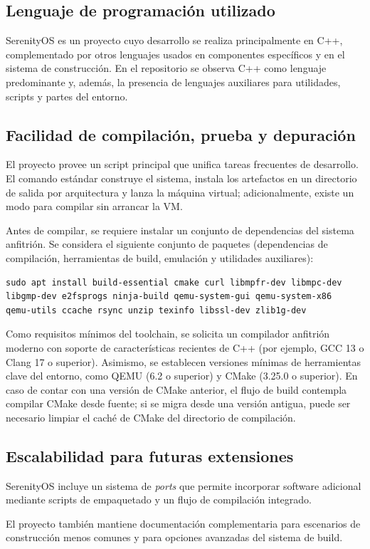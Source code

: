 \subsection{Lenguaje de programación utilizado}
SerenityOS es un proyecto cuyo desarrollo se realiza principalmente en C++, complementado por otros lenguajes usados en componentes específicos y en el sistema de construcción. En el repositorio se observa C++ como lenguaje predominante y, además, la presencia de lenguajes auxiliares para utilidades, scripts y partes del entorno.

\subsection{Facilidad de compilación, prueba y depuración}
El proyecto provee un script principal que unifica tareas frecuentes de desarrollo. El comando estándar construye el sistema, instala los artefactos en un directorio de salida por arquitectura y lanza la máquina virtual; adicionalmente, existe un modo para compilar sin arrancar la VM.

Antes de compilar, se requiere instalar un conjunto de dependencias del sistema anfitrión. Se considera el siguiente conjunto de paquetes (dependencias de compilación, herramientas de build, emulación y utilidades auxiliares):
\begin{verbatim}
sudo apt install build-essential cmake curl libmpfr-dev libmpc-dev
libgmp-dev e2fsprogs ninja-build qemu-system-gui qemu-system-x86
qemu-utils ccache rsync unzip texinfo libssl-dev zlib1g-dev
\end{verbatim}

Como requisitos mínimos del toolchain, se solicita un compilador anfitrión moderno con soporte de características recientes de C++ (por ejemplo, GCC 13 o Clang 17 o superior). Asimismo, se establecen versiones mínimas de herramientas clave del entorno, como QEMU (6.2 o superior) y CMake (3.25.0 o superior). En caso de contar con una versión de CMake anterior, el flujo de build contempla compilar CMake desde fuente; si se migra desde una versión antigua, puede ser necesario limpiar el caché de CMake del directorio de compilación.

\subsection{Escalabilidad para futuras extensiones}
SerenityOS incluye un sistema de \emph{ports} que permite incorporar software adicional mediante scripts de empaquetado y un flujo de compilación integrado.

El proyecto también mantiene documentación complementaria para escenarios de construcción menos comunes y para opciones avanzadas del sistema de build.
